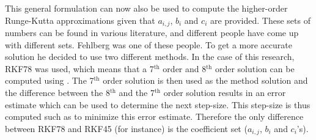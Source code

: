 
\noindent
This general formulation can now also be used to compute the higher-order Runge-Kutta approximations given that $a_{i,j}$, $b_{i}$ and $c_{i}$ are provided. These sets of numbers can be found in various literature, and different people have come up with different sets. Fehlberg was one of these people. To get a more accurate solution he decided to use two different methods. In the case of this research, \ac{RKF78} was used, which means that a 7$^\text{th}$ order and 8$^\text{th}$ order solution can be computed using . The 7$^\text{th}$ order solution is then used as the method solution and the difference between the 8$^\text{th}$ and the 7$^{\text{th}}$ order solution results in an error estimate which can be used to determine the next step-size. This step-size is thus computed such as to minimize this error estimate. Therefore the only difference between \ac{RKF78} and \ac{RKF45} (for instance) is the coefficient set ($a_{i,j}$, $b_{i}$ and $c_{i}$'s). 









